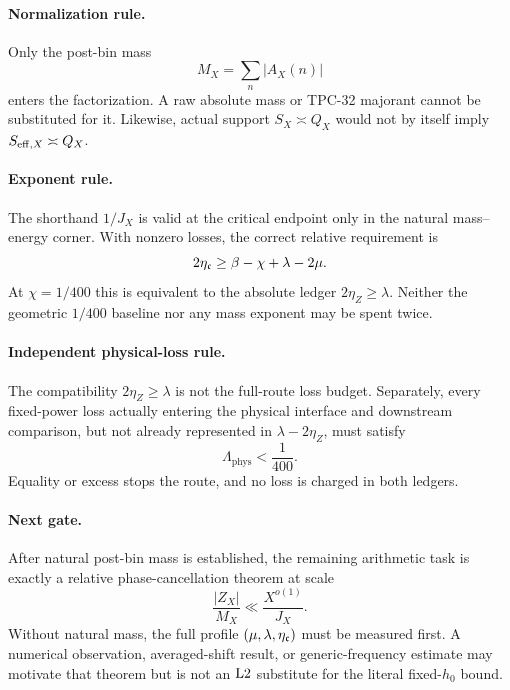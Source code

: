 \paragraph{Normalization rule.}
Only the post-bin mass
\[
 M_X=\sum_n|A_X(n)|
\]
enters the factorization.  A raw absolute mass or TPC-32 majorant
cannot be substituted for it.  Likewise, actual support
\(S_X\asymp Q_X\) would not by itself imply
\(S_{\mathrm{eff},X}\asymp Q_X\).

\paragraph{Exponent rule.}
The shorthand \(1/J_X\) is valid at the critical endpoint only in
the natural mass--energy corner.  With nonzero losses, the correct
relative requirement is
\[
 2\eta_{\mathfrak c}
 \ge
 \beta-\chi+\lambda-2\mu.
\]
At \(\chi=1/400\) this is equivalent to the absolute ledger
\(2\eta_Z\ge\lambda\).  Neither the geometric \(1/400\) baseline nor
any mass exponent may be spent twice.

\paragraph{Independent physical-loss rule.}
The compatibility \(2\eta_Z\ge\lambda\) is not the full-route loss
budget.  Separately, every fixed-power loss actually entering the
physical interface and downstream comparison, but not already
represented in \(\lambda-2\eta_Z\), must satisfy
\[
 \Lambda_{\mathrm{phys}}<\frac1{400}.
\]
Equality or excess stops the route, and no loss is charged in both
ledgers.

\paragraph{Next gate.}
After natural post-bin mass is established, the remaining arithmetic
task is exactly a relative phase-cancellation theorem at scale
\[
 \frac{|Z_X|}{M_X}\ll\frac{X^{o(1)}}{J_X}.
\]
Without natural mass, the full profile
\((\mu,\lambda,\eta_{\mathfrak c})\) must be measured first.  A numerical
observation, averaged-shift result, or generic-frequency estimate may
motivate that theorem but is not an \(\mathrm{L2}\) substitute for the
literal fixed-\(h_0\) bound.
